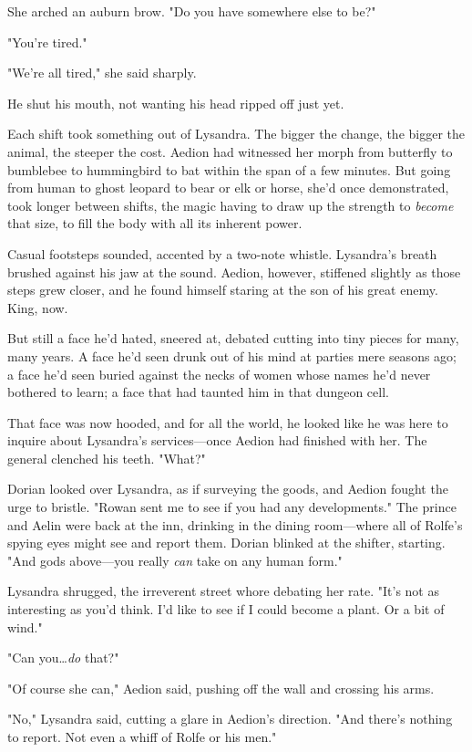 She arched an auburn brow.
"Do you have somewhere else to be?"

"You're tired."

"We're all tired," she said sharply.

He shut his mouth, not wanting his head ripped off just yet.

Each shift took something out of Lysandra.
The bigger the change, the bigger the animal, the steeper the cost.
Aedion had witnessed her morph from butterfly to bumblebee to hummingbird to bat within the span of a few minutes.
But going from human to ghost leopard to bear or elk or horse, she'd once demonstrated, took longer between shifts, the magic having to draw up the strength to \emph{become} that size, to fill the body with all its inherent power.

Casual footsteps sounded, accented by a two-note whistle.
Lysandra's breath brushed against his jaw at the sound.
Aedion, however, stiffened slightly as those steps grew closer, and he found himself staring at the son of his great enemy.
King, now.

But still a face he'd hated, sneered at, debated cutting into tiny pieces for many, many years.
A face he'd seen drunk out of his mind at parties mere seasons ago; a face he'd seen buried against the necks of women whose names he'd never bothered to learn; a face that had taunted him in that dungeon cell.

That face was now hooded, and for all the world, he looked like he was here to inquire about Lysandra's services---once Aedion had finished with her.
The general clenched his teeth.
"What?"

Dorian looked over Lysandra, as if surveying the goods, and Aedion fought the urge to bristle.
"Rowan sent me to see if you had any developments."
The prince and Aelin were back at the inn, drinking in the dining room---where all of Rolfe's spying eyes might see and report them.
Dorian blinked at the shifter, starting.
"And gods above---you really \emph{can} take on any human form."

Lysandra shrugged, the irreverent street whore debating her rate.
"It's not as interesting as you'd think.
I'd like to see if I could become a plant.
Or a bit of wind."

"Can you\ldots \emph{do} that?"

"Of course she can," Aedion said, pushing off the wall and crossing his arms.

"No," Lysandra said, cutting a glare in Aedion's direction.
"And there's nothing to report.
Not even a whiff of Rolfe or his men."

